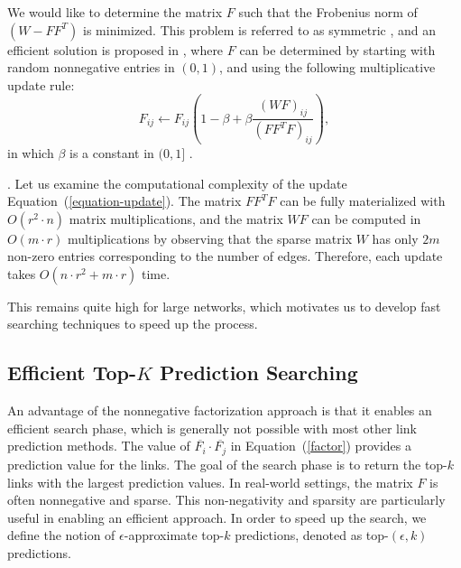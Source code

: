 We would like to determine the matrix $F$ such that the Frobenius
norm of $( W - F F^T)$ is minimized.  This problem is referred to as
symmetric \NMF, and an efficient solution is proposed in
\cite{long}, where $F$ can be determined by starting with random
nonnegative entries in $(0, 1)$, and using the following
multiplicative update rule:
\begin{equation}
\label{equation-update}
F_{ij} \leftarrow F_{ij} ( 1 - \beta + \beta \frac{(W F)_{ij} }{(F F^T F)_{ij}} ),
\end{equation}
in which $\beta$ is a constant in $( 0, 1]$ \cite{ding}.

. Let us examine the computational complexity of
the update Equation~(\ref{equation-update}).
The matrix $F F^T F$  can be fully materialized  with
$O(r^2 \cdot n)$ matrix multiplications, and the matrix $W F$ can be
computed in $O(m \cdot r)$ multiplications  by observing that the
sparse matrix $W$ has only $2m$ non-zero entries corresponding to the
number of edges. Therefore, each update takes $O(n
\cdot r^2 +m\cdot r )$ time.

This remains quite high for large networks, which motivates us to develop fast searching techniques to speed up the process.


\subsection{Efficient Top-$K$ Prediction Searching}
\label{sec-NMF-topk}

An advantage of the nonnegative factorization approach is that it
enables an efficient search phase, which is generally not possible
with most other link prediction methods. The value of
$\overline{F_i} \cdot \overline{F_j}$ in Equation~(\ref{factor}) provides a prediction value
for the links. The goal of the search phase is to return the top-$k$
links with the largest prediction values. In real-world settings, the matrix $F$ is
often nonnegative and sparse. This non-negativity and sparsity are
particularly useful in enabling an efficient approach. In order to
speed up the search, we define the notion of $\epsilon$-approximate
top-$k$ predictions, denoted as top-$(\epsilon, k)$ predictions.

